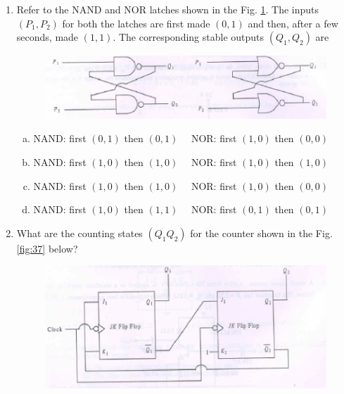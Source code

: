 \documentclass[journal,12pt,twocolumn]{IEEEtran}
\begin{document}
\begin{enumerate}
\item Refer to the NAND and NOR latches shown in the Fig. \ref{fig:36}. The inputs $(P_1,P_2)$ for both the latches are first made $(0,1)$ and then, after a few seconds, made $(1,1)$. The corresponding stable outputs $(Q_1,Q_2)$ are

\begin{figure}

\centering

\includegraphics[width=\columnwidth]{./figs/41.eps}

\caption{}

\label{fig:36}

\end{figure} 

 
\begin{enumerate}[(a)]

\item NAND: first $(0,1)$ then $(0,1)$ \ \ NOR: first $(1,0)$ then $(0,0)$ 

\item NAND: first $(1,0)$ then $(1,0)$ \ \ NOR: first $(1,0)$ then $(1,0)$

\item NAND: first $(1,0)$ then $(1,0)$ \ \ NOR: first $(1,0)$ then $(0,0)$

\item NAND: first $(1,0)$ then $(1,1)$ \ \ NOR: first $(0,1)$ then $(0,1)$

\end{enumerate}

\item What are the counting states $(Q_1Q_2)$ for the counter shown in the Fig. \ref{fig:37} below?

\begin{figure}

\centering

\includegraphics[width=\columnwidth]{./figs/42.eps}


\end{figure}
\end{enumerate}
\end{document}
